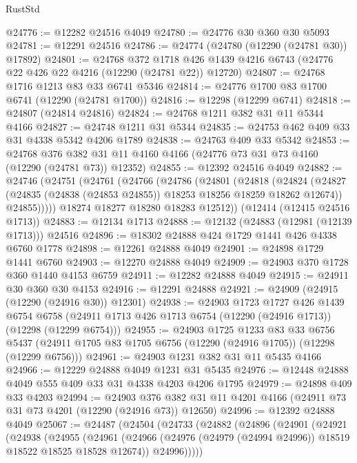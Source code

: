\begin{lexlean}{RustStd}
\begin{coremodule}
{\begin{coremodule}
{{{{{{{{{{{{{{{{{{{{{{{{{{{{{{{{{{{{{{{{{{{{{{{{{{@24776 := @12282 @24516 @4049
@24780 := @24776 @30 @360 @30 @5093
@24781 := @12291 @24516
@24786 := @24774 (@24780 (@12290 (@24781 @30)) @17892)
@24801 := @24768
    @372
    @1718
    @426
    @1439
    @4216
    @6743
    (@24776 @22 @426 @22 @4216 (@12290 (@24781 @22)) @12720)
@24807 := @24768 @1716 @1213 @83 @33 @6741 @5346
@24814 := @24776 @1700 @83 @1700 @6741 (@12290 (@24781 @1700))
@24816 := @12298 (@12299 @6741)
@24818 := @24807 (@24814 @24816)
@24824 := @24768 @1211 @382 @31 @11 @5344 @4166
@24827 := @24748 @1211 @31 @5344
@24835 := @24753 @462 @409 @33 @31 @4338 @5342 @4206 @1789
@24838 := @24763 @409 @33 @5342
@24853 := @24768
    @376
    @382
    @31
    @11
    @4160
    @4166
    (@24776 @73 @31 @73 @4160 (@12290 (@24781 @73)) @12352)
@24855 := @12392 @24516 @4049
@24882 := @24746
    (@24751
      (@24761
        (@24766
          (@24786
            (@24801
              (@24818
                (@24824
                  (@24827 (@24835 (@24838 (@24853 @24855)) @18253 @18256 @18259 @18262 @12674))
                  @24855)))))
        @18274
        @18277
        @18280
        @18283
        @12512))
    (@12414 (@12415 @24516 @1713))
@24883 := @12134 @1713
@24888 := @12132 (@24883 (@12981 (@12139 @1713))) @24516
@24896 := @18302 @24888 @424 @1729 @1441 @426 @4338 @6760 @1778
@24898 := @12261 @24888 @4049
@24901 := @24898 @1729 @1441 @6760
@24903 := @12270 @24888 @4049
@24909 := @24903 @370 @1728 @360 @1440 @4153 @6759
@24911 := @12282 @24888 @4049
@24915 := @24911 @30 @360 @30 @4153
@24916 := @12291 @24888
@24921 := @24909 (@24915 (@12290 (@24916 @30)) @12301)
@24938 := @24903
    @1723
    @1727
    @426
    @1439
    @6754
    @6758
    (@24911 @1713 @426 @1713 @6754 (@12290 (@24916 @1713)) (@12298 (@12299 @6754)))
@24955 := @24903
    @1725
    @1233
    @83
    @33
    @6756
    @5437
    (@24911 @1705 @83 @1705 @6756 (@12290 (@24916 @1705)) (@12298 (@12299 @6756)))
@24961 := @24903 @1231 @382 @31 @11 @5435 @4166
@24966 := @12229 @24888 @4049 @1231 @31 @5435
@24976 := @12448 @24888 @4049 @555 @409 @33 @31 @4338 @4203 @4206 @1795
@24979 := @24898 @409 @33 @4203
@24994 := @24903
    @376
    @382
    @31
    @11
    @4201
    @4166
    (@24911 @73 @31 @73 @4201 (@12290 (@24916 @73)) @12650)
@24996 := @12392 @24888 @4049
@25067 := @24487
    (@24504
      (@24733
        (@24882
          (@24896
            (@24901
              (@24921
                (@24938
                  (@24955
                    (@24961
                      (@24966 (@24976 (@24979 (@24994 @24996)) @18519 @18522 @18525 @18528 @12674))
                      @24996)))))
}}}}}}}}}}}}}}}}}}}}}}}}}}}}}}}}}}}}}}}}}}}}}}}}}}
\end{coremodule}}
\end{coremodule}
\end{lexlean}
